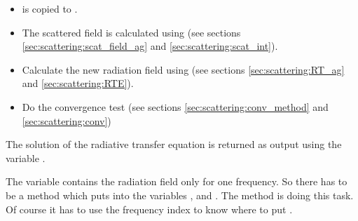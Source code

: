 \begin{itemize}
\item {} is copied to .
\item The scattered field is calculated using
    (see sections \ref{sec:scattering:scat_field_ag} and
    \ref{sec:scattering:scat_int}).
\item Calculate the new radiation field using
 (see sections \ref{sec:scattering:RT_ag} and
  \ref{sec:scattering:RTE}).
\item Do the convergence test (see sections
  \ref{sec:scattering:conv_method} and \ref{sec:scattering:conv})
\end{itemize}
The solution of the radiative transfer equation is returned as output
using the variable . 

The variable  contains the radiation field only
for one frequency. So there has to be a method which puts
 into the variables ,
 and . The method
 is doing this task.
Of course it has to use the frequency index to know where
to put .
 

\label{sec:scattering:scat_field_ag}

